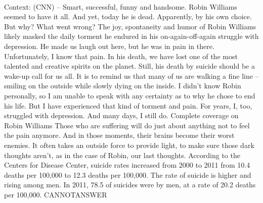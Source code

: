 \documentclass[11pt,a4paper, onecolumn]{article}
\begin{document}
\\ Context: (CNN) -- Smart, successful, funny and handsome. Robin Williams seemed to have it all. And yet, today he is dead. Apparently, by his own choice. But why? What went wrong? The joy, spontaneity and humor of Robin Williams likely masked the daily torment he endured in his on-again-off-again struggle with depression. He made us laugh out here, but he was in pain in there. Unfortunately, I know that pain. In his death, we have lost one of the most talented and creative spirits on the planet. Still, his death by suicide should be a wake-up call for us all. It is to remind us that many of us are walking a fine line -- smiling on the outside while slowly dying on the inside. I didn't know Robin personally, so I am unable to speak with any certainty as to why he chose to end his life. But I have experienced that kind of torment and pain. For years, I, too, struggled with depression. And many days, I still do. Complete coverage on Robin Williams Those who are suffering will do just about anything not to feel the pain anymore. And in those moments, their brains become their worst enemies. It often takes an outside force to provide light, to make sure those dark thoughts aren't, as in the case of Robin, our last thoughts. According to the Centers for Disease Center, suicide rates increased from 2000 to 2011 from 10.4 deaths per 100,000 to 12.3 deaths per 100,000. The rate of suicide is higher and rising among men. In 2011, 78.5  of suicides were by men, at a rate of 20.2 deaths per 100,000. CANNOTANSWER
\end{document}
